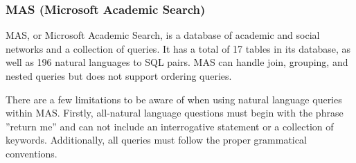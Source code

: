 \subsubsection{MAS (Microsoft Academic Search)}

MAS, or Microsoft Academic Search\cite{roy2013the}, is a database of academic and social networks and a collection of queries. It has a total of 17 tables in its database, as well as 196 natural languages to SQL pairs. MAS can handle join, grouping, and nested queries but does not support ordering queries.

There are a few limitations to be aware of when using natural language queries within MAS. Firstly, all-natural language questions must begin with the phrase ”return me” and can not include an interrogative statement or a collection of keywords. Additionally, all queries must follow the proper grammatical conventions.
